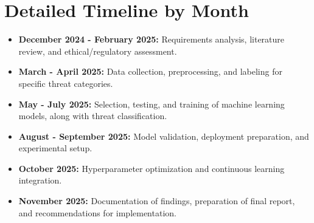 \documentclass[a4paper,twoside,12pt]{report}
\begin{document}
\section{Detailed Timeline by Month}

\begin{itemize}
    \item \textbf{December 2024 - February 2025:} Requirements analysis, literature review, and ethical/regulatory assessment.
    \item \textbf{March - April 2025:} Data collection, preprocessing, and labeling for specific threat categories.
    \item \textbf{May - July 2025:} Selection, testing, and training of machine learning models, along with threat classification.
    \item \textbf{August - September 2025:} Model validation, deployment preparation, and experimental setup.
    \item \textbf{October 2025:} Hyperparameter optimization and continuous learning integration.
    \item \textbf{November 2025:} Documentation of findings, preparation of final report, and recommendations for implementation.
\end{itemize}





\end{document}
